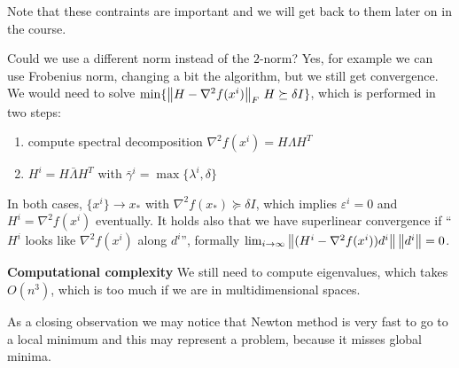 \documentclass[computational_mathematics.tex]{subfiles}
\begin{document}
\begin{obs}
   Note that these contraints are important and we will get back to them later on in the course.
\end{obs}
 
Could we use a different norm instead of the $2$-norm? Yes, for example we can use Frobenius norm, changing a bit the algorithm, but we still get convergence. We would need to solve $\min \{{\left\lVert H - \nabla^2 f(x^i)\right\rVert}_{F} ~ H \succeq \delta I\}$, which is performed in two steps:
\begin{enumerate}
  \item compute spectral decomposition $\nabla^2 f(x^i) = H \Lambda H^T$
  \item $H^i = H \bar{\Lambda} H^T$ with $\bar{\gamma}^i = \max \{\lambda^i, \delta\}$
\end{enumerate}
In both cases, $\{x^i\} \to x_*$ with $\nabla^2 f(x_*) \succeq \delta I$, which implies $\varepsilon^i = 0$ and $H^i = \nabla^2 f(x^i)$ eventually. It holds also that we have superlinear convergence if ``$H^i$ looks like $\nabla^2 f(x^i)$ along $d^i$'', formally $\lim_{i \to \infty} \left\lVert(H^i - \nabla^2 f(x^i)) d^i\right\rVert \left\lVert d^i\right\rVert = 0$.

\begin{myframe}{\bf Computational complexity}
We still need to compute eigenvalues, which takes $O(n^3)$, which is too much if we are in multidimensional spaces.
\end{myframe}

As a closing observation we may notice that Newton method is very fast to go to a local minimum and this may represent a problem, because it misses global minima.
\end{document}
